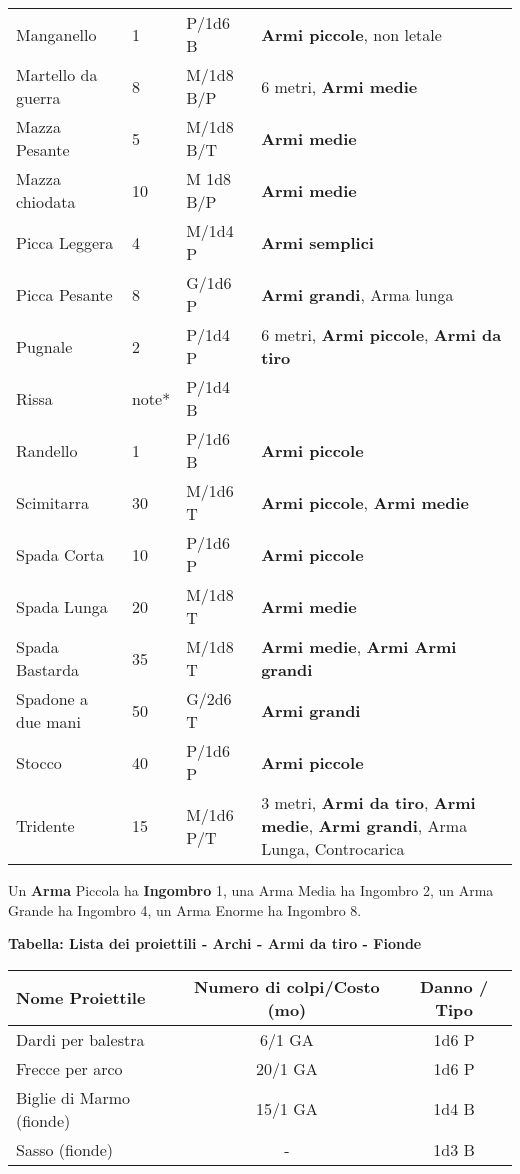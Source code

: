 \documentclass[12pt,a4paper,twoside,openany]{book}
\begin{document}
\begin{xltabular}{0.99\textwidth}{lllX}
Manganello& 1& P/1d6 B& \textbf{Armi piccole}, non letale\\
Martello da guerra& 8& M/1d8 B/P& 6 metri, \textbf{Armi medie}\\
Mazza Pesante& 5& M/1d8 B/T& \textbf{Armi medie}\\
Mazza chiodata& 10& M 1d8 B/P& \textbf{Armi medie}\\
Picca Leggera& 4& M/1d4 P&\textbf{Armi semplici}\\
Picca Pesante& 8& G/1d6 P&\textbf{Armi grandi}, Arma lunga\\
Pugnale& 2& P/1d4 P& 6 metri, \textbf{Armi piccole}, \textbf{Armi da tiro}\\
Rissa& note*& P/1d4 B&\\
Randello& 1& P/1d6 B& \textbf{Armi piccole}\\
Scimitarra& 30 & M/1d6 T&\textbf{Armi piccole}, \textbf{Armi medie}\\
Spada Corta& 10 & P/1d6 P&\textbf{Armi piccole}\\
Spada Lunga& 20 & M/1d8 T&\textbf{Armi medie}\\
Spada Bastarda& 35 & M/1d8 T&\textbf{Armi medie}, \textbf{Armi Armi grandi}\\
Spadone a due mani& 50 & G/2d6 T&\textbf{Armi grandi}\\
Stocco& 40 & P/1d6 P& \textbf{Armi piccole}\\
Tridente& 15 & M/1d6 P/T& 3 metri, \textbf{Armi da tiro}, \textbf{Armi medie}, \textbf{Armi grandi}, Arma Lunga, Controcarica\\
\end{xltabular}

\medskip

Un \textbf{Arma} Piccola ha \textbf{Ingombro} 1, una Arma Media ha Ingombro 2, un Arma Grande ha Ingombro 4, un Arma Enorme ha Ingombro 8.

\bigskip

\textbf{Tabella: Lista dei proiettili - Archi - Armi da tiro - Fionde}

\begin{tabular}{lcc}
\textbf{Nome Proiettile}& \textbf{Numero di colpi/Costo (mo)} & \textbf{Danno / Tipo}\\
\toprule
Dardi per balestra & 6/1 GA & 1d6 P\\
Frecce per arco& 20/1 GA & 1d6 P\\
Biglie di Marmo (fionde)& 15/1 GA & 1d4 B\\
Sasso (fionde)& -& 1d3 B\\
\end{tabular}
\end{document}

